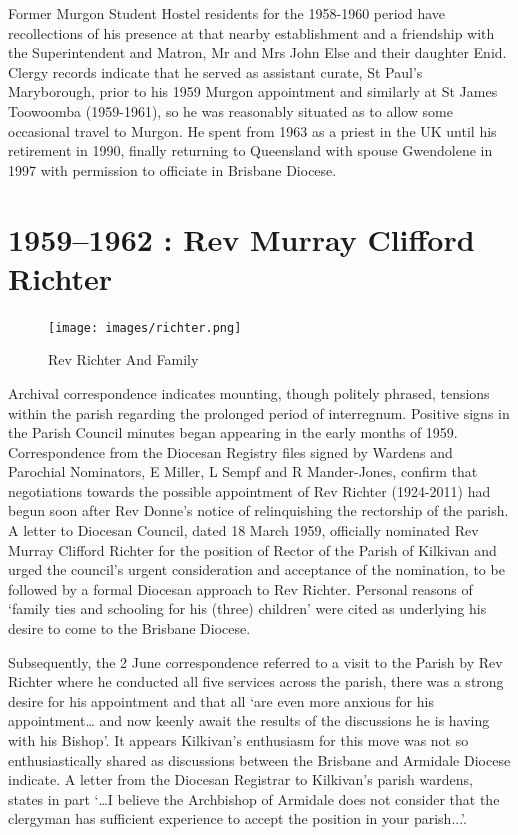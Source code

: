 Former Murgon Student Hostel residents for the 1958-1960 period have
recollections of his presence at that nearby establishment and a
friendship with the Superintendent and Matron, Mr and Mrs John Else and
their daughter Enid. Clergy records indicate that he served as assistant
curate, St Paul's Maryborough, prior to his 1959 Murgon appointment and
similarly at St James Toowoomba (1959-1961), so he was reasonably
situated as to allow some occasional travel to Murgon. He spent from
1963 as a priest in the UK until his retirement in 1990, finally
returning to Queensland with spouse Gwendolene in 1997 with permission
to officiate in Brisbane Diocese.

\printendnotes
\setcounter{endnote}{0}
\chapter{1959--1962 : Rev Murray Clifford
Richter}




\begin{figure}
\begin{center}
\texttt{[image: images/richter.png]}
\caption{Rev Richter And Family}
\end{center}
\end{figure}


Archival correspondence indicates mounting, though politely phrased,
tensions within the parish regarding the prolonged period of
interregnum. Positive signs in the Parish Council minutes began
appearing in the early months of 1959. Correspondence from the Diocesan
Registry files signed by Wardens and Parochial Nominators, E Miller, L
Sempf and R Mander-Jones, confirm that negotiations towards the possible
appointment of Rev Richter (1924-2011) had begun soon after Rev Donne's
notice of relinquishing the rectorship of the parish. A letter to
Diocesan Council, dated 18 March 1959, officially nominated Rev Murray
Clifford Richter for the position of Rector of the Parish of Kilkivan
and urged the council's urgent consideration and acceptance of the
nomination, to be followed by a formal Diocesan approach to Rev Richter.
Personal reasons of `family ties and schooling for his (three) children'
were cited as underlying his desire to come to the Brisbane Diocese.

Subsequently, the 2 June correspondence referred to a visit to the
Parish by Rev Richter where he conducted all five services across the
parish, there was a strong desire for his appointment and that all `are
even more anxious for his appointment\ldots{} and now keenly await the
results of the discussions he is having with his Bishop'. It appears
Kilkivan's enthusiasm for this move was not so enthusiastically shared
as discussions between the Brisbane and Armidale Diocese indicate. A
letter from the Diocesan Registrar to Kilkivan's parish wardens, states
in part `\ldots I believe the Archbishop of Armidale does not consider
that the clergyman has sufficient experience to accept the position in
your parish...'.

